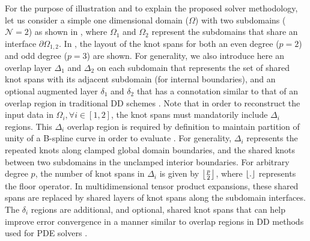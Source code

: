 For the purpose of illustration and to explain the proposed solver methodology, let us consider a simple one dimensional domain ($\Omega$) with two subdomains ($\mathcal{N}=2$) as shown in , where $\Omega_1$ and $\Omega_2$ represent the subdomains that share an interface $\partial \Omega_{1,2}$. In , the layout of the knot spans for both an even degree ($p=2$) and odd degree ($p=3$) are shown. For generality, we also introduce here an overlap layer $\Delta_1$ and $\Delta_2$ on each subdomain that represents the set of shared knot spans with its adjacent subdomain (for internal boundaries), and an optional augmented layer $\delta_1$ and $\delta_2$ that has a connotation similar to that of an overlap region in traditional DD schemes \cite{smith-ddm}. Note that in order to reconstruct the input data in $\Omega_i, \forall i \in [1,2]$, the knot spans must mandatorily include $\Delta_i$ regions. This $\Delta_i$ overlap region is required by definition to maintain partition of unity of a B-spline curve in order to evaluate . For generality, $\Delta_i$ represents the repeated knots along clamped global domain boundaries, and the shared knots between two subdomains in the unclamped interior boundaries.
%
For arbitrary degree $p$, the number of knot spans in $\Delta_i$ is given by $\left \lfloor \frac{p}{2} \right \rfloor$, where $\left \lfloor . \right \rfloor$ represents the floor operator. In multidimensional tensor product expansions, these shared spans are replaced by shared layers of knot spans along the subdomain interfaces. The $\delta_i$ regions are additional, and optional, shared knot spans that can help improve error convergence in a manner similar to overlap regions in DD methods used for PDE solvers \cite{gander-rasm, smith-ddm}. 

